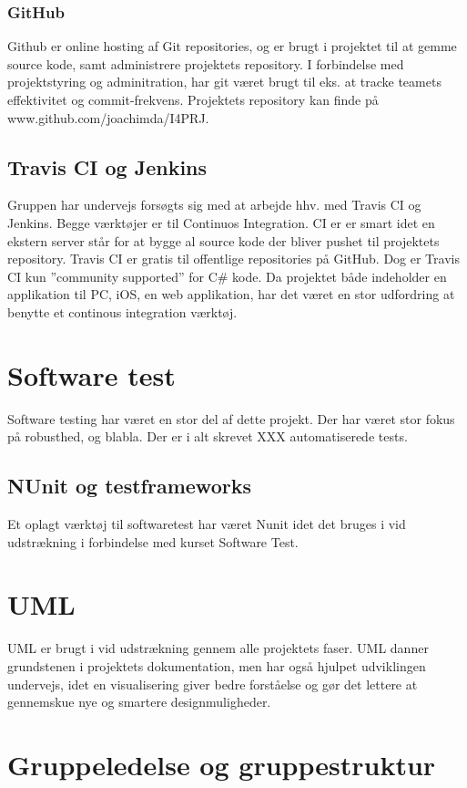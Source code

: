 \subsubsection{GitHub}
Github er online hosting af Git repositories, og er brugt i projektet til at gemme source kode, samt administrere projektets repository. I forbindelse med projektstyring og adminitration, har git været brugt til eks. at tracke teamets effektivitet og commit-frekvens.
Projektets repository kan finde på www.github.com/joachimda/I4PRJ.

\subsection{Travis CI og Jenkins}
Gruppen har undervejs forsøgts sig med at arbejde hhv. med Travis CI og Jenkins. Begge værktøjer er til Continuos Integration. CI er er smart idet en ekstern server står for at bygge al source kode der bliver pushet til projektets repository.  Travis CI er gratis til offentlige repositories på GitHub. Dog er Travis CI kun ”community supported” for C\# kode.
Da projektet både indeholder en applikation til PC, iOS, en web applikation, har det været en stor udfordring at benytte et continous integration værktøj.

\section{Software test}
Software testing har været en stor del af dette projekt. Der har været stor fokus på robusthed, og blabla. Der er i alt skrevet XXX automatiserede tests.

\subsection{NUnit og testframeworks}
Et oplagt værktøj til softwaretest har været Nunit idet det bruges i vid udstrækning i forbindelse med kurset Software Test.

\section{UML}
UML er brugt i vid udstrækning gennem alle projektets faser. UML danner grundstenen i projektets dokumentation, men har også hjulpet udviklingen undervejs, idet en visualisering giver bedre forståelse og gør det lettere at gennemskue nye og smartere designmuligheder.

\section{Gruppeledelse og gruppestruktur}